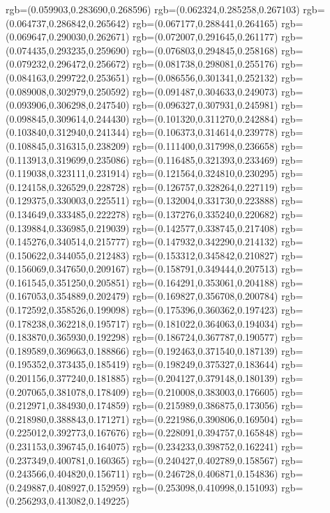 {{{			rgb=(0.059903,0.283690,0.268596)
			rgb=(0.062324,0.285258,0.267103)
			rgb=(0.064737,0.286842,0.265642)
			rgb=(0.067177,0.288441,0.264165)
			rgb=(0.069647,0.290030,0.262671)
			rgb=(0.072007,0.291645,0.261177)
			rgb=(0.074435,0.293235,0.259690)
			rgb=(0.076803,0.294845,0.258168)
			rgb=(0.079232,0.296472,0.256672)
			rgb=(0.081738,0.298081,0.255176)
			rgb=(0.084163,0.299722,0.253651)
			rgb=(0.086556,0.301341,0.252132)
			rgb=(0.089008,0.302979,0.250592)
			rgb=(0.091487,0.304633,0.249073)
			rgb=(0.093906,0.306298,0.247540)
			rgb=(0.096327,0.307931,0.245981)
			rgb=(0.098845,0.309614,0.244430)
			rgb=(0.101320,0.311270,0.242884)
			rgb=(0.103840,0.312940,0.241344)
			rgb=(0.106373,0.314614,0.239778)
			rgb=(0.108845,0.316315,0.238209)
			rgb=(0.111400,0.317998,0.236658)
			rgb=(0.113913,0.319699,0.235086)
			rgb=(0.116485,0.321393,0.233469)
			rgb=(0.119038,0.323111,0.231914)
			rgb=(0.121564,0.324810,0.230295)
			rgb=(0.124158,0.326529,0.228728)
			rgb=(0.126757,0.328264,0.227119)
			rgb=(0.129375,0.330003,0.225511)
			rgb=(0.132004,0.331730,0.223888)
			rgb=(0.134649,0.333485,0.222278)
			rgb=(0.137276,0.335240,0.220682)
			rgb=(0.139884,0.336985,0.219039)
			rgb=(0.142577,0.338745,0.217408)
			rgb=(0.145276,0.340514,0.215777)
			rgb=(0.147932,0.342290,0.214132)
			rgb=(0.150622,0.344055,0.212483)
			rgb=(0.153312,0.345842,0.210827)
			rgb=(0.156069,0.347650,0.209167)
			rgb=(0.158791,0.349444,0.207513)
			rgb=(0.161545,0.351250,0.205851)
			rgb=(0.164291,0.353061,0.204188)
			rgb=(0.167053,0.354889,0.202479)
			rgb=(0.169827,0.356708,0.200784)
			rgb=(0.172592,0.358526,0.199098)
			rgb=(0.175396,0.360362,0.197423)
			rgb=(0.178238,0.362218,0.195717)
			rgb=(0.181022,0.364063,0.194034)
			rgb=(0.183870,0.365930,0.192298)
			rgb=(0.186724,0.367787,0.190577)
			rgb=(0.189589,0.369663,0.188866)
			rgb=(0.192463,0.371540,0.187139)
			rgb=(0.195352,0.373435,0.185419)
			rgb=(0.198249,0.375327,0.183644)
			rgb=(0.201156,0.377240,0.181885)
			rgb=(0.204127,0.379148,0.180139)
			rgb=(0.207065,0.381078,0.178409)
			rgb=(0.210008,0.383003,0.176605)
			rgb=(0.212971,0.384930,0.174859)
			rgb=(0.215989,0.386875,0.173056)
			rgb=(0.218980,0.388843,0.171271)
			rgb=(0.221986,0.390806,0.169504)
			rgb=(0.225012,0.392773,0.167676)
			rgb=(0.228091,0.394757,0.165848)
			rgb=(0.231153,0.396745,0.164075)
			rgb=(0.234233,0.398752,0.162241)
			rgb=(0.237349,0.400781,0.160365)
			rgb=(0.240427,0.402789,0.158567)
			rgb=(0.243566,0.404820,0.156711)
			rgb=(0.246728,0.406871,0.154836)
			rgb=(0.249887,0.408927,0.152959)
			rgb=(0.253098,0.410998,0.151093)
			rgb=(0.256293,0.413082,0.149225)
}}}
